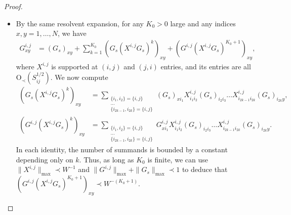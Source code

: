 \begin{proof}
\begin{itemize}
\begin{align}
\end{align}
%
\item By the same resolvent expansion, for any $K_{0}>0$ large and any indices $x,y=1,\ldots,N$, we have 
%
\begin{align*}
G^{i,j}_{xy}&=(G_{s})_{xy}+\sum_{k=1}^{K_{0}}(G_{s}(X^{i,j}G_{s})^{k})_{xy}+\left(G^{i,j}(X^{i,j}G_{s})^{K_{0}+1}\right)_{xy},
\end{align*}
%
where $X^{i,j}$ is supported at $(i,j)$ and $(j,i)$ entries, and its entries are all $\mathrm{O}_{\prec}(S_{ij}^{1/2})$. We now compute
%
\begin{align}
(G_{s}(X^{i,j}G_{s})^{k})_{xy}&=\sum_{\substack{\{i_{1},i_{2}\}=\{i,j\}\\\ldots\\\{i_{2k-1},i_{2k}\}=\{i,j\}}}(G_{s})_{xi_{1}}X^{i,j}_{i_{1}i_{2}}(G_{s})_{i_{2}i_{3}}\ldots X^{i,j}_{i_{2k-1}i_{2k}}(G_{s})_{i_{2k}y},\label{clt-resolvent}\\
(G^{i,j}(X^{i,j}G_{s})^{k})_{xy}&=\sum_{\substack{\{i_{1},i_{2}\}=\{i,j\}\\\ldots\\\{i_{2k-1},i_{2k}\}=\{i,j\}}}G^{i,j}_{xi_{1}}X^{i,j}_{i_{1}i_{2}}(G_{s})_{i_{2}i_{3}}\ldots X^{i,j}_{i_{2k-1}i_{2k}}(G_{s})_{i_{2k}y}.
\end{align}
%
In each identity, the number of summands is bounded by a constant depending only on $k$. Thus, as long as $K_{0}$ is finite, we can use $\|X^{i,j}\|_{\max}\prec W^{-1}$ and $\|G^{i,j}\|_{\max}+\|G_{s}\|_{\max}\prec1$ to deduce that $(G^{i,j}(X^{i,j}G_{s})^{K_{0}+1})_{xy}\prec W^{-(K_{0}+1)}$. 


\end{itemize}
\end{proof}
